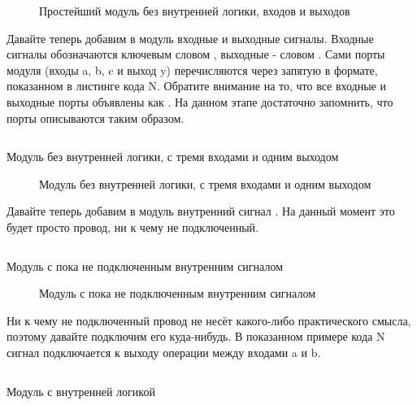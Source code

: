 \begin{figure}[H]
  \centering
  \def\svgwidth{7cm}
  
  \caption{Простейший модуль без внутренней логики, входов и выходов}
\end{figure}

Давайте теперь добавим в модуль входные и выходные сигналы. Входные сигналы обозначаются ключевым словом , выходные - словом . Сами порты модуля (входы a, b, c и выход y) перечисляются через запятую в формате, показанном в листинге кода N. Обратите внимание на то, что все входные и выходные порты объявлены как . На данном этапе достаточно запомнить, что порты описываются таким образом.

\begin{listing}[H]
	\inputminted{SystemVerilog}{code_examples/lab_1/module_example_2.sv}
	\caption{Модуль без внутренней логики, с тремя входами и одним выходом}
\end{listing}


\begin{figure}[H]
  \centering
  \def\svgwidth{9cm}
  
  \caption{Модуль без внутренней логики, с тремя входами и одним выходом}
\end{figure}

Давайте теперь добавим в модуль внутренний сигнал . На данный момент это будет просто  провод, ни к чему не подключенный.

\begin{listing}[H]
	\inputminted{SystemVerilog}{code_examples/lab_1/module_example_3.sv}
	\caption{Модуль с пока не подключенным внутренним сигналом}
\end{listing}


\begin{figure}[H]
  \centering
  \def\svgwidth{9cm}
  
  \caption{Модуль с пока не подключенным внутренним сигналом}
\end{figure}

Ни к чему не подключенный провод не несёт какого-либо практического смысла, поэтому давайте подключим его куда-нибудь. В показанном примере кода N сигнал  подключается к выходу операции  между входами a и b.

\begin{listing}[H]
	\inputminted{SystemVerilog}{code_examples/lab_1/module_example_4.sv}
	\caption{Модуль с внутренней логикой}
\end{listing}

